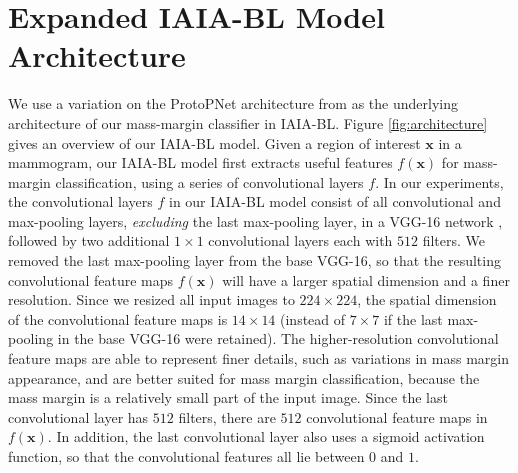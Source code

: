 \documentclass[11pt]{article}
\begin{document}
\FloatBarrier
\section{Expanded IAIA-BL Model Architecture}
\label{app:architecture}
\FloatBarrier

We use a variation on the ProtoPNet architecture from \cite{PPNet} as the underlying architecture of our mass-margin classifier in IAIA-BL. Figure \ref{fig:architecture} gives an overview of our IAIA-BL model. Given a region of interest $\mathbf{x}$ in a mammogram, our IAIA-BL model first extracts useful features $f(\mathbf{x})$ for mass-margin classification, using a series of convolutional layers $f$. In our experiments, the convolutional layers $f$ in our IAIA-BL model consist of all convolutional and max-pooling layers, \textit{excluding} the last max-pooling layer, in a VGG-16 network \citep{simonyan2015very}, followed by two additional $1 \times 1$ convolutional layers each with $512$ filters. We removed the last max-pooling layer from the base VGG-16, so that the resulting convolutional feature maps $f(\mathbf{x})$ will have a larger spatial dimension and a finer resolution. Since we resized all input images to $224 \times 224$, the spatial dimension of the convolutional feature maps is $14 \times 14$ (instead of $7 \times 7$ if the last max-pooling in the base VGG-16 were retained). The higher-resolution convolutional feature maps are able to represent finer details, such as variations in mass margin appearance, and are better suited for mass margin classification, because the mass margin is a relatively small part of the input image. Since the last convolutional layer has $512$ filters, there are $512$ convolutional feature maps in $f(\mathbf{x})$. In addition, the last convolutional layer also uses a sigmoid activation function, so that the convolutional features all lie between $0$ and $1$.
\end{document}
